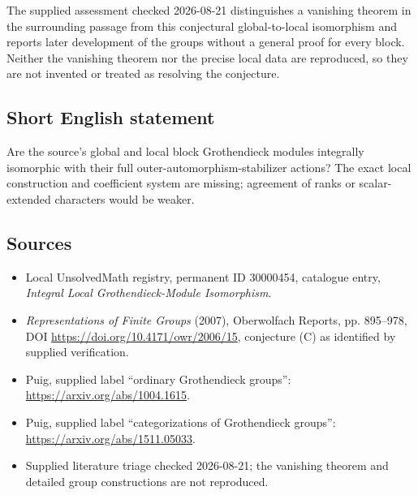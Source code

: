 \documentclass[11pt]{article}
\begin{document}
The supplied assessment checked 2026-08-21 distinguishes a vanishing theorem in the surrounding passage from this conjectural global-to-local isomorphism and reports later development of the groups without a general proof for every block. Neither the vanishing theorem nor the precise local data are reproduced, so they are not invented or treated as resolving the conjecture.
\subsection{Short English statement}
Are the source's global and local block Grothendieck modules integrally isomorphic with their full outer-automorphism-stabilizer actions? The exact local construction and coefficient system are missing; agreement of ranks or scalar-extended characters would be weaker.
\subsection{Sources}
\begin{itemize}
\item Local UnsolvedMath registry, permanent ID 30000454, catalogue entry, \emph{Integral Local Grothendieck-Module Isomorphism}.
\item \emph{Representations of Finite Groups} (2007), Oberwolfach Reports, pp. 895--978, DOI \url{https://doi.org/10.4171/owr/2006/15}, conjecture (C) as identified by supplied verification.
\item Puig, supplied label ``ordinary Grothendieck groups'': \url{https://arxiv.org/abs/1004.1615}.
\item Puig, supplied label ``categorizations of Grothendieck groups'': \url{https://arxiv.org/abs/1511.05033}.
\item Supplied literature triage checked 2026-08-21; the vanishing theorem and detailed group constructions are not reproduced.
\end{itemize}
\end{document}
